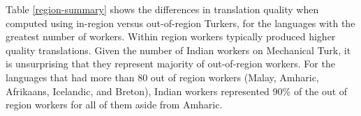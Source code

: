 \documentclass[11pt]{article}
\begin{document}
Table \ref{region-summary} shows the differences in translation quality when computed using in-region versus out-of-region Turkers, for the languages with the greatest number of workers.  Within region workers typically produced higher quality translations. 
Given the number of Indian workers on Mechanical Turk, it is unsurprising that they represent majority of out-of-region workers.  For the languages that had more than 80 out of region workers (Malay, Amharic, Afrikaans, Icelandic, and Breton), Indian workers represented 90\% of the out of region workers for all of them aside from Amharic.



%
%
\end{document}
